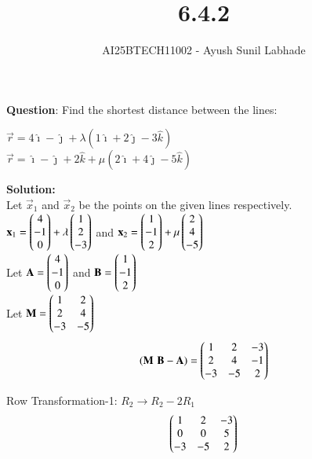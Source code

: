 \documentclass[journal,12pt,onecolumn]{IEEEtran}
\begin{document}
\title{6.4.2}
\author{AI25BTECH11002 - Ayush Sunil Labhade}
{\let\newpage\relax\maketitle}


\textbf{Question}: Find the shortest distance between the lines:\\
\begin{center}
	$\vec{r} = 4\hat{\imath} - \hat{\jmath} + \lambda(1\hat{\imath} + 2\hat{\jmath} -3\hat{k})$\\
$\vec{r} = \hat{\imath} - \hat{\jmath} + 2\hat{k}+ \mu(2\hat{\imath} + 4\hat{\jmath} -5\hat{k})$
\end{center}



\textbf{Solution:}\\
Let $\vec{x}_1$ and $\vec{x}_2$ be the points on the given lines respectively.\\
$\mathbf{x}_1 = \begin{pmatrix}4 \\ -1 \\ 0\end{pmatrix} + \lambda\begin{pmatrix}1 \\ 2 \\ -3\end{pmatrix}$ and $\mathbf{x}_2 = \begin{pmatrix}1 \\ -1 \\ 2\end{pmatrix} + \mu\begin{pmatrix}2 \\ 4 \\ -5\end{pmatrix}$\\
Let $\mathbf{A} = \begin{pmatrix}4 \\ -1 \\ 0\end{pmatrix}$ and $\mathbf{B} = \begin{pmatrix}1 \\ -1 \\ 2\end{pmatrix}$\\
Let $\mathbf{M} = \begin{pmatrix}1 & 2 \\ 2 & 4 \\ -3 & -5\end{pmatrix}$\\

\begin{align}
(\mathbf{M} \, \, \mathbf{B}-\mathbf{A}) = \begin{pmatrix}1 & 2 & -3 \\ 2 & 4 & -1 \\ -3 & -5 & 2\end{pmatrix}
\end{align}

Row Transformation-1: $R_2 \rightarrow R_2 - 2R_1$
\begin{align}
\begin{pmatrix}1 & 2 & -3 \\ 0 & 0 & 5 \\ -3 & -5 & 2\end{pmatrix}
\end{align}
\end{document}

